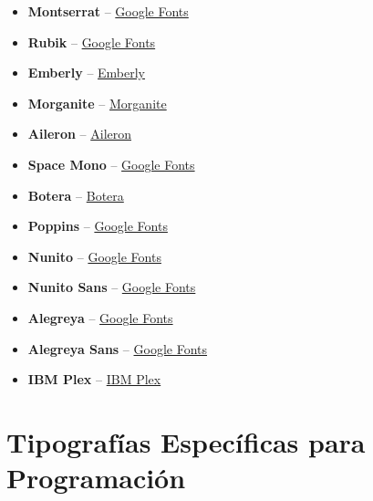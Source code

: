 \documentclass[
  jou,
  floatsintext,
  longtable,
  a4paper,
  nolmodern,
  notxfonts,
  notimes,
  colorlinks=true,linkcolor=blue,citecolor=blue,urlcolor=blue]{apa7}
\providecommand{\tightlist}{%
  \setlength{\itemsep}{0pt}\setlength{\parskip}{0pt}}
\begin{document}
\begin{itemize}
\tightlist
\item
  \textbf{Montserrat} --
  \href{https://fonts.google.com/specimen/Montserrat}{Google Fonts}\\
\item
  \textbf{Rubik} --
  \href{https://fonts.google.com/specimen/Rubik}{Google Fonts}\\
\item
  \textbf{Emberly} -- \href{https://bit.ly/3jgtfLD}{Emberly}\\
\item
  \textbf{Morganite} -- \href{https://bit.ly/37m7Y0P}{Morganite}\\
\item
  \textbf{Aileron} -- \href{http://dotcolon.net/font/aileron}{Aileron}\\
\item
  \textbf{Space Mono} --
  \href{https://fonts.google.com/specimen/Space}{Google Fonts}\\
\item
  \textbf{Botera} -- \href{http://javimontoya.es/botera.html}{Botera}\\
\item
  \textbf{Poppins} --
  \href{https://fonts.google.com/specimen/Poppins}{Google Fonts}\\
\item
  \textbf{Nunito} --
  \href{https://fonts.google.com/specimen/Nunito}{Google Fonts}\\
\item
  \textbf{Nunito Sans} --
  \href{https://fonts.google.com/specimen/Nunito}{Google Fonts}\\
\item
  \textbf{Alegreya} --
  \href{https://fonts.google.com/specimen/Alegreya}{Google Fonts}\\
\item
  \textbf{Alegreya Sans} --
  \href{https://fonts.google.com/specimen/Alegreya}{Google Fonts}\\
\item
  \textbf{IBM Plex} -- \href{https://www.ibm.com/plex/}{IBM Plex}
\end{itemize}

\section{Tipografías Específicas para
Programación}\label{tipografuxedas-especuxedficas-para-programaciuxf3n}
\end{document}
